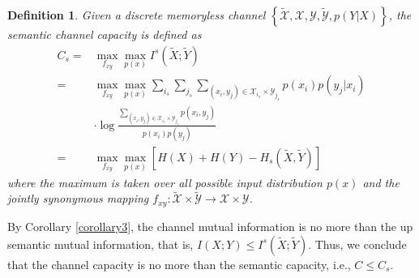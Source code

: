 \documentclass[12pt, draftclsnofoot,onecolumn]{IEEEtran}
\newtheorem{definition}{\bf{Definition}}
\begin{document}
\begin{definition}
Given a discrete memoryless channel $\left\{\tilde{\mathcal{X}},\mathcal{X},\mathcal{Y},\tilde{\mathcal{Y}}, p(Y|X)\right\}$, the semantic channel capacity is defined as
\begin{equation}
\begin{aligned}
C_s=&\max_{f_{xy}}\max_{p(x)} I^s(\tilde{X};\tilde{Y})\\
=&\max_{f_{xy}}\max_{p(x)}\sum_{i_s}\sum_{j_s}\sum_{(x_i,y_j)\in \mathcal{X}_{i_s}\times \mathcal{Y}_{j_s}}p\left(x_i\right)p\left(y_j\left|x_i\right.\right) \\
&\cdot \log \frac{\sum_{(x_i,y_j) \in \mathcal{X}_{i_s} \times \mathcal{Y}_{j_s}}p\left(x_i,y_j\right)}{p\left(x_i\right)p\left(y_j\right)}\\
=&\max_{f_{xy}}\max_{p(x)}\left[H(X)+H(Y)-H_s(\tilde{X},\tilde{Y})\right]
\end{aligned}
\end{equation}
where the maximum is taken over all possible input distribution $p(x)$ and the jointly synonymous mapping $f_{xy}:\tilde{\mathcal{X}}\times\tilde{\mathcal{Y}}\to\mathcal{X}\times\mathcal{Y}$.
\end{definition}

By Corollary \ref{corollary3}, the channel mutual information is no more than the up semantic mutual information, that is, $I(X;Y)\leq I^s(\tilde{X};\tilde{Y})$. Thus, we conclude that the channel capacity is no more than the semantic capacity, i.e., $C\leq C_s$.
\end{document}

